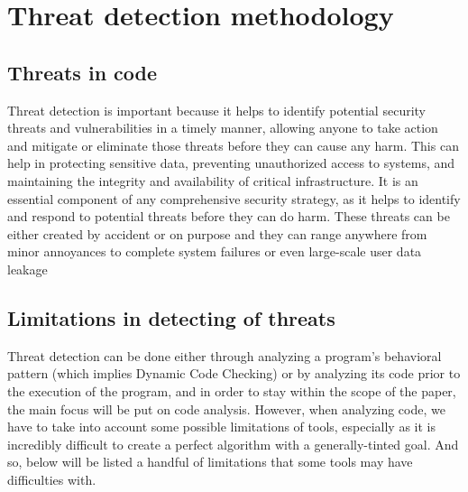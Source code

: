 
\chapter{Threat detection methodology}\label{cap:threat detection methodology}


\section{Threats in code}

Threat detection is important because it helps to identify potential security threats and vulnerabilities in a timely manner, allowing anyone to take action and mitigate or eliminate those threats before they can cause any harm. This can help in protecting sensitive data, preventing unauthorized access to systems, and maintaining the integrity and availability of critical infrastructure. It is an essential component of any comprehensive security strategy, as it helps to identify and respond to potential threats before they can do harm. These threats can be either created by accident or on purpose and they can range anywhere from minor annoyances to complete system failures or even large-scale user data leakage


\section{Limitations in detecting of threats}

Threat detection can be done either through analyzing a program's behavioral pattern (which implies Dynamic Code Checking) or by analyzing its code prior to the execution of the program, and in order to stay within the scope of the paper, the main focus will be put on code analysis. However, when analyzing code, we have to take into account some possible limitations of tools, especially as it is incredibly difficult to create a perfect algorithm with a generally-tinted goal. And so, below will be listed a handful of limitations that some tools may have difficulties with.

